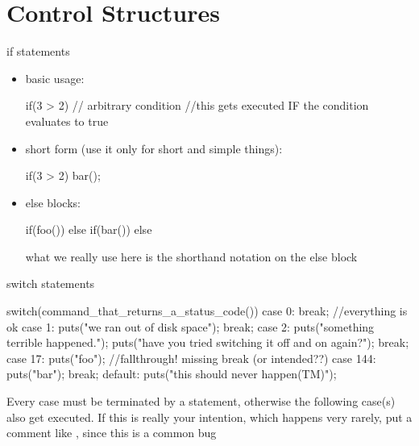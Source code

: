 \documentclass[10pt,graphics,aspectratio=169,table]{beamer}
\begin{document}
\section{Control Structures}
\begin{frame}[fragile]{if statements}
    \begin{itemize}
    \item basic usage:
        \begin{codeblock} 
if(3 > 2){  // arbitrary condition
    //this gets executed IF the condition evaluates to true
}
        \end{codeblock}
    \item short form (use it only for short and simple things):
        \begin{codeblock} 
if(3 > 2) bar();
        \end{codeblock}

    \item else blocks:
        \begin{codeblock} 
if(foo()){ 
}
else if(bar()){ 
}
else{ 
}
        \end{codeblock}

        what we really use here is the shorthand notation on the else block

    \end{itemize}
\end{frame}

\begin{frame}[fragile]{switch statements}
    \begin{codeblock}
switch(command_that_returns_a_status_code()){
    case 0: break; //everything is ok
    case 1: puts("we ran out of disk space"); break;
    case 2: {
        puts("something terrible happened.");
        puts("have you tried switching it off and on again?");
    }break;
    case 17: puts("foo"); //fallthrough! missing break (or intended??)
    case 144: puts("bar"); break;
    default: puts("this should never happen(TM)");
}
    \end{codeblock}
    Every case must be terminated by a  statement, otherwise the 
    following case(s) also get executed. If this is really your intention,
    which happens very rarely, put a comment like , 
    since this is a common bug
\end{frame}
\end{document}
